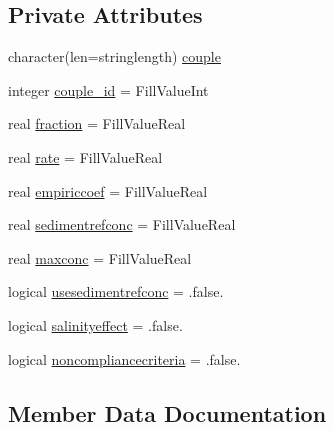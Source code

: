 \subsection*{Private Attributes}
\begin{DoxyCompactItemize}
\item 
character(len=stringlength) \mbox{\hyperlink{structmodulewaterproperties_1_1t__partition_aee9ded8a826547cdec9a222668b4ed6c}{couple}}
\item 
integer \mbox{\hyperlink{structmodulewaterproperties_1_1t__partition_a9dbe9a445d695bc201e6691714867993}{couple\+\_\+id}} = Fill\+Value\+Int
\item 
real \mbox{\hyperlink{structmodulewaterproperties_1_1t__partition_adb83b543a65e249e607901efb231e630}{fraction}} = Fill\+Value\+Real
\item 
real \mbox{\hyperlink{structmodulewaterproperties_1_1t__partition_aa09474763eb20831a1b31321e1d1394d}{rate}} = Fill\+Value\+Real
\item 
real \mbox{\hyperlink{structmodulewaterproperties_1_1t__partition_a3a71a6743b712d9c81c99b6484eae6fe}{empiriccoef}} = Fill\+Value\+Real
\item 
real \mbox{\hyperlink{structmodulewaterproperties_1_1t__partition_a6ecbe7e5b323da75ada49a78f2d4cec2}{sedimentrefconc}} = Fill\+Value\+Real
\item 
real \mbox{\hyperlink{structmodulewaterproperties_1_1t__partition_a9cb525123b1c4ec6a2b6edebb2b903b4}{maxconc}} = Fill\+Value\+Real
\item 
logical \mbox{\hyperlink{structmodulewaterproperties_1_1t__partition_a8a58c54836f117557529cfa0343bf02e}{usesedimentrefconc}} = .false.
\item 
logical \mbox{\hyperlink{structmodulewaterproperties_1_1t__partition_a0e603ef5f2c8a247912f78c19080946d}{salinityeffect}} = .false.
\item 
logical \mbox{\hyperlink{structmodulewaterproperties_1_1t__partition_ab4eed5ed97370d57cc537e164626db89}{noncompliancecriteria}} = .false.
\end{DoxyCompactItemize}


\subsection{Member Data Documentation}
\mbox{\label{structmodulewaterproperties_1_1t__partition_aee9ded8a826547cdec9a222668b4ed6c}} 
